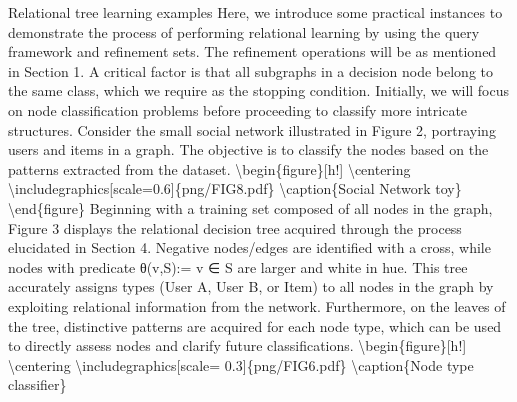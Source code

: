 \documentclass{article}%
\begin{document}
\newline%
Relational tree learning examples\newline%
\newline%
Here, we introduce some practical instances to demonstrate the process of performing relational learning by using the query framework and refinement sets. The refinement operations will be as mentioned in Section 1. A critical factor is that all subgraphs in a decision node belong to the same class, which we require as the stopping condition. Initially, we will focus on node classification problems before proceeding to classify more intricate structures.\newline%
\newline%
Consider the small social network illustrated in Figure 2, portraying users and items in a graph. The objective is to classify the nodes based on the patterns extracted from the dataset.\newline%
\newline%
\textbackslash{}begin\{figure\}{[}h!{]}\newline%
\textbackslash{}centering\newline%
\textbackslash{}includegraphics{[}scale=0.6{]}\{png/FIG8.pdf\}\newline%
\textbackslash{}caption\{Social Network toy\}\newline%
\newline%
\textbackslash{}end\{figure\}\newline%
\newline%
Beginning with a training set composed of all nodes in the graph, Figure 3 displays the relational decision tree acquired through the process elucidated in Section 4. Negative nodes/edges are identified with a cross, while nodes with predicate θ(v,S):= v ∈ S are larger and white in hue. This tree accurately assigns types (User A, User B, or Item) to all nodes in the graph by exploiting relational information from the network. Furthermore, on the leaves of the tree, distinctive patterns are acquired for each node type, which can be used to directly assess nodes and clarify future classifications.\newline%
\newline%
\textbackslash{}begin\{figure\}{[}h!{]}\newline%
\textbackslash{}centering\newline%
\textbackslash{}includegraphics{[}scale= 0.3{]}\{png/FIG6.pdf\}\newline%
\textbackslash{}caption\{Node type classifier\}\newline%
\end{document}
